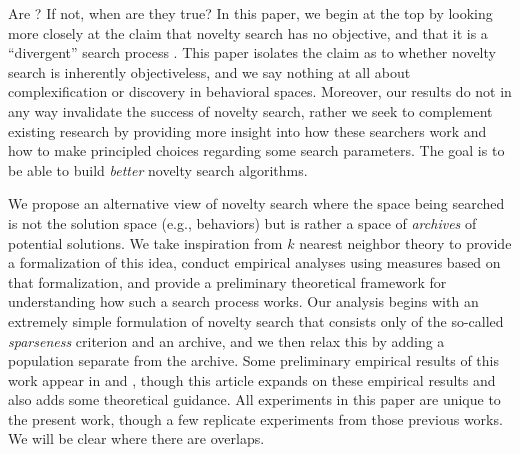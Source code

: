 \documentclass[twoside]{article}
\begin{document}

Are ?  If not, when are they true?  In this paper, we begin at the top by  looking more closely at the claim that novelty search has no objective, and that it is a ``divergent'' search process \citep{Lehman2016frai,Lehman2015gecco,StanleyLehman2015}.  This paper isolates the claim as to whether novelty search is inherently objectiveless, and we say nothing at all about complexification or discovery in behavioral spaces.  Moreover, our results do not in any way invalidate the success of novelty search, rather we seek to complement existing research by providing more insight into how these searchers work and how to make principled choices regarding some search parameters.  The goal is to be able to build \emph{better} novelty search algorithms.

We propose an alternative view of novelty search where the space being searched is not the solution space (e.g., behaviors) but is rather a space of \emph{archives} of potential solutions.  We take inspiration from $k$ nearest neighbor theory to provide a formalization of this idea, conduct empirical analyses using measures based on that formalization, and provide a preliminary theoretical framework for understanding how such a search process works.  Our analysis begins with an extremely simple formulation of novelty search that consists only of the so-called \emph{sparseness} criterion and an archive, and we then relax this by adding a population separate from the archive.  Some preliminary empirical results of this work appear in \citet{Wiegand2020flairs} and \citet{Wiegand2021flairs}, though this article expands on these empirical results and also adds some theoretical guidance.  All experiments in this paper are unique to the present work, though a few replicate experiments from those previous works.  We will be clear where there are overlaps.
\end{document}
